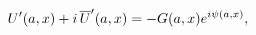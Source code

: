 \[\mathop{U\/}\nolimits'\!\left(a,x\right)+i\mathop{\overline{U}\/}\nolimits'\!%
\left(a,x\right)=-G(a,x)e^{i\psi(a,x)},\]